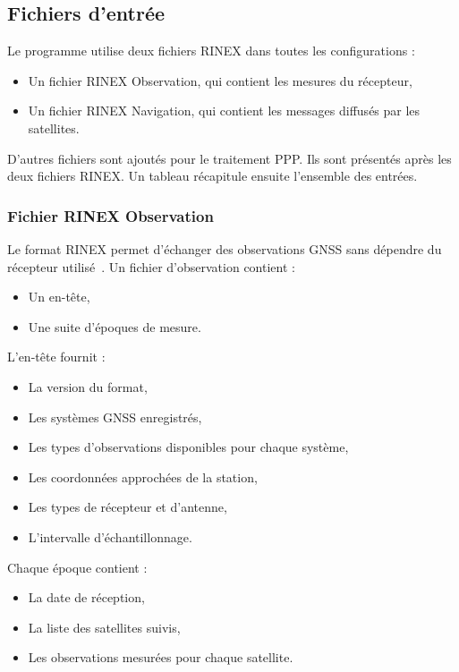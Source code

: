 \subsection{Fichiers d'entrée}
\label{sec:implementation_input_files}

Le programme utilise deux fichiers RINEX dans toutes les configurations :

\begin{itemize}
    \item Un fichier RINEX Observation, qui contient les mesures du récepteur,
    \item Un fichier RINEX Navigation, qui contient les messages diffusés par
    les satellites.
\end{itemize}

D'autres fichiers sont ajoutés pour le traitement PPP. Ils sont présentés
après les deux fichiers RINEX. Un tableau récapitule ensuite l'ensemble des
entrées.

\subsubsection{Fichier RINEX Observation}

Le format RINEX permet d'échanger des observations GNSS sans dépendre du
récepteur utilisé~\cite{rinex304}. Un fichier d'observation contient :

\begin{itemize}
    \item Un en-tête,
    \item Une suite d'époques de mesure.
\end{itemize}

L'en-tête fournit :

\begin{itemize}
    \item La version du format,
    \item Les systèmes GNSS enregistrés,
    \item Les types d'observations disponibles pour chaque système,
    \item Les coordonnées approchées de la station,
    \item Les types de récepteur et d'antenne,
    \item L'intervalle d'échantillonnage.
\end{itemize}

Chaque époque contient :

\begin{itemize}
    \item La date de réception,
    \item La liste des satellites suivis,
    \item Les observations mesurées pour chaque satellite.
\end{itemize}


